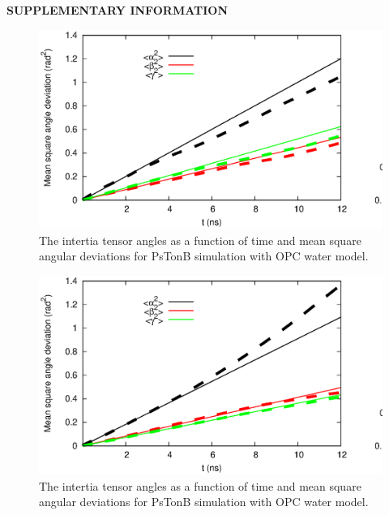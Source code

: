 \documentclass[pre,aps,floatfix,authordate1-4,twocolumn]{revtex4-1}
\begin{document}
\begin{center}
{\bf SUPPLEMENTARY INFORMATION}
\end{center}
\begin{figure}[!h]
  \includegraphics[width=16.5cm]{../Figs/RMASDplotPsTonBtip4pT310K.eps}%
  \caption{The intertia tensor angles as a function of time and mean square angular
    deviations for PsTonB simulation with OPC water model.
    \label{RMASDplotLOG}}%
\end{figure}
\begin{figure}[!h]
  \includegraphics[width=16.5cm]{../Figs/RMASDplotPsTonBtip4pT298K.eps}%
  \caption{The intertia tensor angles as a function of time and mean square angular
    deviations for PsTonB simulation with OPC water model.
    \label{RMASDplotLOG}}%
\end{figure}


\end{document}
